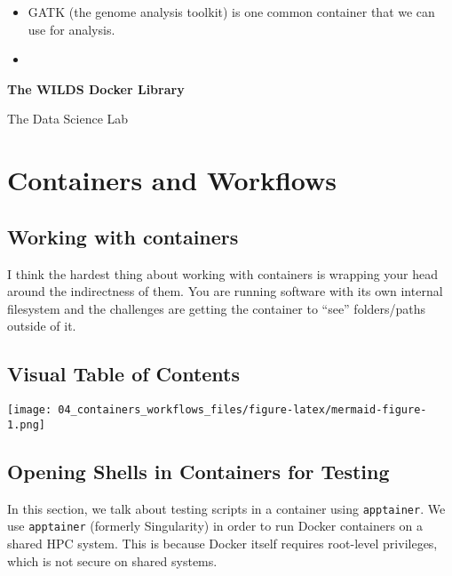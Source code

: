 \documentclass[
  letterpaper,
  DIV=11,
  numbers=noendperiod]{scrreprt}
\providecommand{\tightlist}{%
  \setlength{\itemsep}{0pt}\setlength{\parskip}{0pt}}
\begin{document}
\begin{itemize}
\tightlist
\item
  GATK (the genome analysis toolkit) is one common container that we can
  use for analysis.
\item
\end{itemize}

\begin{tcolorbox}[enhanced jigsaw, breakable, leftrule=.75mm, colframe=quarto-callout-color-frame, left=2mm, toprule=.15mm, arc=.35mm, rightrule=.15mm, opacityback=0, bottomrule=.15mm, colback=white]

\vspace{-3mm}\textbf{The WILDS Docker Library}\vspace{3mm}

The Data Science Lab

\end{tcolorbox}


\chapter{Containers and Workflows}\label{containers-and-workflows}

\section{Working with containers}\label{sec-containers}

I think the hardest thing about working with containers is wrapping your
head around the indirectness of them. You are running software with its
own internal filesystem and the challenges are getting the container to
``see'' folders/paths outside of it.

\section{Visual Table of Contents}\label{visual-table-of-contents}

\texttt{[image: 04\_containers\_workflows\_files/figure-latex/mermaid-figure-1.png]}

\section{Opening Shells in Containers for
Testing}\label{sec-open-container}

In this section, we talk about testing scripts in a container using
\texttt{apptainer}. We use \texttt{apptainer} (formerly Singularity) in
order to run Docker containers on a shared HPC system. This is because
Docker itself requires root-level privileges, which is not secure on
shared systems.
\end{document}
